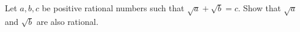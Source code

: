 Let $a,b,c$ be positive rational numbers such that $\sqrt a+\sqrt b=c$. Show that $\sqrt a$ and $\sqrt b$ are also rational.